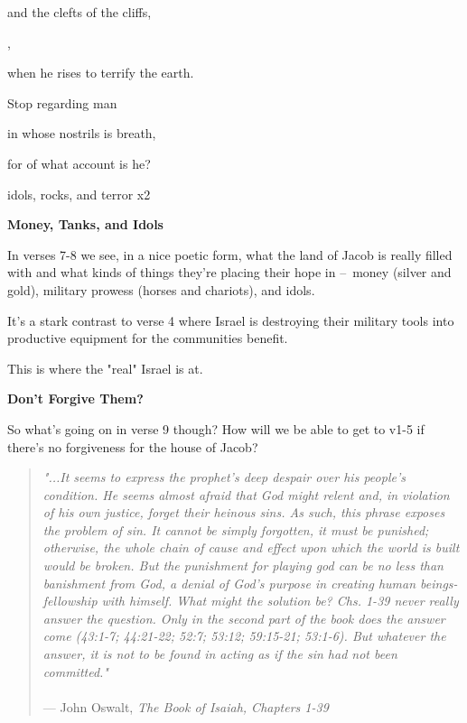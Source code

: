 \documentclass[11pt]{article}
\begin{document}
\begin{chiasticoutline}{.99999em}{2em}
{\poetryline and the clefts of the cliffs,


\poetryline {},

\poetryline when he rises to terrify the earth.

 Stop regarding man

\poetryline in whose nostrils is breath,

\poetryline for of what account is he?
}{idols, rocks, and terror x2}

\end{chiasticoutline}


\vspace{3em}
{\large\bfseries Money, Tanks, and Idols}
\vspace{1em}

In verses 7-8 we see, in a nice poetic form, what the land of Jacob is really filled with
and what kinds of things they're placing their hope in – money (silver and gold), military prowess (horses and chariots), and idols.

{\vspace{1em}}

It's a stark contrast to verse 4 where Israel is destroying their military tools into productive equipment for the communities benefit.

This is where the "real" Israel is at.


\newpage{}
{\large\bfseries Don't Forgive Them?}
\vspace{1em}

So what's going on in verse 9 though? How will we be able to get to v1-5 if there's no forgiveness for the house of Jacob?

{\vspace{1em}}

\begin{quote}
\textit{"...It seems to express the prophet's deep despair over his people's condition. He seems almost afraid that God might relent and, in violation of his own justice, forget their heinous sins. As such, this phrase exposes the problem of sin. It cannot be simply forgotten, it must be punished; otherwise, the whole chain of cause and effect upon which the world is built would be broken. But the punishment for playing god can be no less than banishment from God, a denial of God's purpose in creating human beings-fellowship with himself. What might the solution be? Chs. 1-39 never really answer the question. Only in the second part of the book does the answer come (43:1-7; 44:21-22; 52:7; 53:12;
59:15-21; 53:1-6). But whatever the answer, it is not to be found in acting as if the sin had not been committed."}\\\\
\hfill --- John Oswalt, \textit{The Book of Isaiah, Chapters 1-39}
\end{quote}
\end{document}
